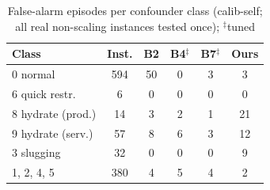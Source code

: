 \begin{table}[t]
\caption{False-alarm episodes per confounder class (calib-self; all real non-scaling instances tested once); $^\ddagger$tuned}\label{tab:faclass}
\scriptsize
\begin{tabular*}{\columnwidth}{@{\extracolsep\fill}lccccc}
\toprule
Class & Inst. & B2 & B4$^\ddagger$ & B7$^\ddagger$ & Ours \\
\midrule
0 normal & 594 & 50 & 0 & 3 & 3 \\
6 quick restr. & 6 & 0 & 0 & 0 & 0 \\
8 hydrate (prod.) & 14 & 3 & 2 & 1 & 21 \\
9 hydrate (serv.) & 57 & 8 & 6 & 3 & 12 \\
3 slugging & 32 & 0 & 0 & 0 & 9 \\
1, 2, 4, 5 & 380 & 4 & 5 & 4 & 2 \\
\bottomrule
\end{tabular*}
\end{table}
